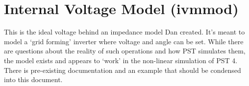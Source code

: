\section{Internal Voltage Model (ivmmod)}  
This is the ideal voltage behind an impedance model Dan created.
It's meant to model a `grid forming' inverter where voltage and angle can be set.
While there are questions about the reality of such operations and how PST simulates them, the model exists and appears to `work' in the non-linear simulation  of PST 4.
There is pre-existing documentation and an example that should be condensed into this document.